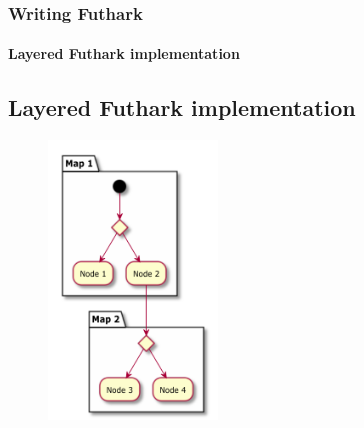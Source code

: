 \documentclass[12pt,t]{beamer}
\begin{document}
\begin{frame}
  \frametitle{Writing Futhark}
  \framesubtitle{Layered Futhark implementation}
\subsection{Layered Futhark implementation}

\begin{figure}
\centering
\includegraphics[width=0.4\textwidth]{tree_flat}
\end{figure}

\end{frame}
\end{document}
